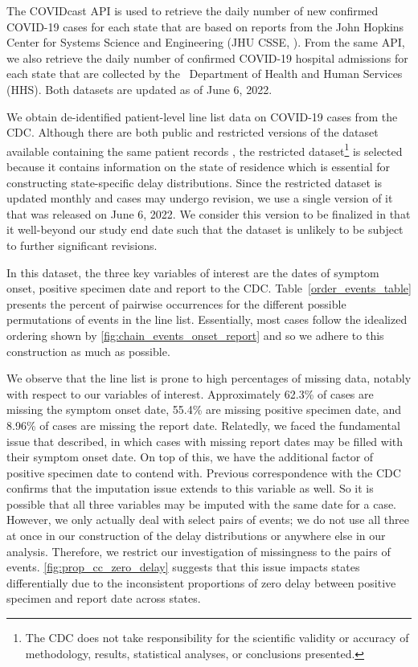 \documentclass{article}
\begin{document}
The COVIDcast API \citep{reinhart2021open} is used to retrieve the daily number
of new confirmed COVID-19 cases for each state that are based on reports from
the John Hopkins Center for Systems Science and Engineering (JHU CSSE,
\citealp{dong2020interactive}). From the same API, we also retrieve the daily
number of confirmed COVID-19 hospital admissions for each state that are
collected by the \US\ Department of Health and Human Services (HHS). Both
datasets are updated as of June 6, 2022.

We obtain de-identified patient-level line list data on COVID-19 cases from the
CDC. Although there are both public and restricted versions of the dataset
available containing the same patient records \citep{cdc2020casepub,
cdc2020caserestr}, the restricted dataset\footnote{The CDC does not take
responsibility for the scientific validity or accuracy of methodology, results,
statistical analyses, or conclusions presented.} is selected because it contains
information on the state of residence which is essential for constructing
state-specific delay distributions. Since the restricted dataset is updated
monthly and cases may undergo revision, we use a single version of it that was
released on June 6, 2022. We consider this version to be finalized in that it
well-beyond our study end date such that the dataset is unlikely to be subject
to further significant revisions.

In this dataset, the three key variables of interest are the dates of symptom
onset, positive specimen date and report to the CDC. 
Table~\ref{order_events_table} presents the percent of pairwise occurrences for the different possible permutations of events in the line list. 
Essentially, most cases follow the idealized ordering shown by \autoref{fig:chain_events_onset_report} and so we adhere to this construction as much as possible. 

We observe that the line list is prone to
high percentages of missing data, notably with respect to our variables of
interest. Approximately 62.3\% of cases are missing the symptom onset date, 55.4\% are missing
positive specimen date, and 8.96\% of cases are missing the report date. Relatedly, we faced the
fundamental issue that \citet{jahja2022real} described, in which cases with
missing report dates may be filled with their symptom onset date. On top of this, we have the additional factor
of positive specimen date to contend with. Previous correspondence with the CDC confirms that the imputation issue
extends to this variable as well. So it is possible that all three variables may be imputed with the same date for a case. %
However, we only actually deal with select pairs of events; we do not use all three at once
in our construction of the delay distributions or anywhere else in our analysis.
Therefore, we restrict our investigation of missingness to the pairs of events. 
\autoref{fig:prop_cc_zero_delay} suggests that this issue impacts states differentially
due to the inconsistent proportions of zero delay between positive specimen and report date across states. 
\end{document}
